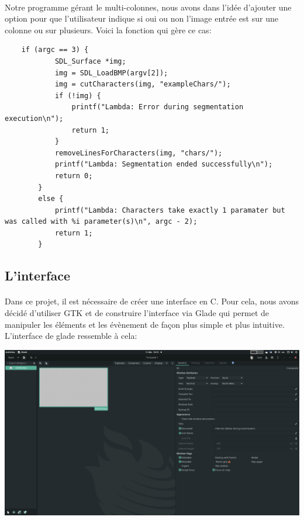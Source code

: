 \documentclass{article}
\begin{document}
\paragraph{}Notre programme gérant le multi-colonnes, nous avons dans l'idée d'ajouter une option pour que l'utilisateur indique si oui ou non l'image entrée est sur une colonne ou sur plusieurs. Voici la fonction qui gère ce cas:

\begin{lstlisting}
	if (argc == 3) {
			SDL_Surface *img;
			img = SDL_LoadBMP(argv[2]);
			img = cutCharacters(img, "exampleChars/");
			if (!img) {
				printf("Lambda: Error during segmentation execution\n");
				return 1;
			}
			removeLinesForCharacters(img, "chars/");
			printf("Lambda: Segmentation ended successfully\n");
			return 0;
		}
		else {
			printf("Lambda: Characters take exactly 1 paramater but was called with %i parameter(s)\n", argc - 2);
			return 1;
		}
\end{lstlisting}


\subsection{L'interface}

\paragraph{}Dans ce projet, il est nécessaire de créer une interface en C. Pour cela, nous avons décidé d'utiliser GTK et de construire l'interface via Glade qui permet de manipuler les éléments et les évènement de façon plus simple et plus intuitive. L'interface de glade ressemble à cela:

\begin{center}
	\includegraphics[scale=0.18]{glade_start_screen}
\end{center}
\end{document}
